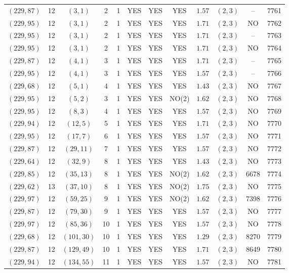 \begin{longtable}{|c|c|c|c|c|c|c|c|c|c|c|c|}
$(229,87)$ & 12 & $(3,1)$ & 2 & 1 & YES & YES & YES & $1.57$ & $(2,3)$ & -- & 7761\\
$(229,95)$ & 12 & $(3,1)$ & 2 & 1 & YES & YES & YES & $1.71$ & $(2,3)$ & NO & 7762\\
$(229,95)$ & 12 & $(3,1)$ & 2 & 1 & YES & YES & YES & $1.71$ & $(2,3)$ & -- & 7763\\
$(229,95)$ & 12 & $(3,1)$ & 2 & 1 & YES & YES & YES & $1.71$ & $(2,3)$ & NO & 7764\\
$(229,87)$ & 12 & $(4,1)$ & 3 & 1 & YES & YES & YES & $1.71$ & $(2,3)$ & -- & 7765\\
$(229,95)$ & 12 & $(4,1)$ & 3 & 1 & YES & YES & YES & $1.57$ & $(2,3)$ & -- & 7766\\
$(229,68)$ & 12 & $(5,1)$ & 4 & 1 & YES & YES & YES & $1.43$ & $(2,3)$ & NO & 7767\\
$(229,95)$ & 12 & $(5,2)$ & 3 & 1 & YES & YES & NO(2) & $1.62$ & $(2,3)$ & NO & 7768\\
$(229,95)$ & 12 & $(8,3)$ & 4 & 1 & YES & YES & YES & $1.57$ & $(2,3)$ & NO & 7769\\
$(229,94)$ & 12 & $(12,5)$ & 5 & 1 & YES & YES & YES & $1.71$ & $(2,3)$ & NO & 7770\\
$(229,95)$ & 12 & $(17,7)$ & 6 & 1 & YES & YES & YES & $1.57$ & $(2,3)$ & NO & 7771\\
$(229,87)$ & 12 & $(29,11)$ & 7 & 1 & YES & YES & YES & $1.57$ & $(2,3)$ & NO & 7772\\
$(229,64)$ & 12 & $(32,9)$ & 8 & 1 & YES & YES & YES & $1.43$ & $(2,3)$ & NO & 7773\\
$(229,85)$ & 12 & $(35,13)$ & 8 & 1 & YES & YES & NO(2) & $1.62$ & $(2,3)$ & 6678 & 7774\\
$(229,62)$ & 13 & $(37,10)$ & 8 & 1 & YES & YES & NO(2) & $1.75$ & $(2,3)$ & NO & 7775\\
$(229,97)$ & 12 & $(59,25)$ & 9 & 1 & YES & YES & NO(2) & $1.62$ & $(2,3)$ & 7398 & 7776\\
$(229,87)$ & 12 & $(79,30)$ & 9 & 1 & YES & YES & YES & $1.57$ & $(2,3)$ & NO & 7777\\
$(229,97)$ & 12 & $(85,36)$ & 10 & 1 & YES & YES & YES & $1.57$ & $(2,3)$ & NO & 7778\\
$(229,68)$ & 12 & $(101,30)$ & 10 & 1 & YES & YES & YES & $1.29$ & $(2,3)$ & 8270 & 7779\\
$(229,87)$ & 12 & $(129,49)$ & 10 & 1 & YES & YES & YES & $1.71$ & $(2,3)$ & 8649 & 7780\\
$(229,94)$ & 12 & $(134,55)$ & 11 & 1 & YES & YES & YES & $1.57$ & $(2,3)$ & NO & 7781\\

\end{longtable}
